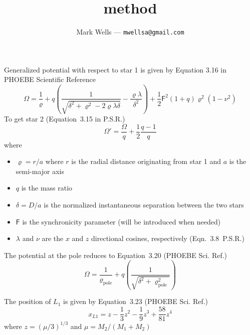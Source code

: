 \documentclass[12pt]{article}
\title{
	method
}
\author{
	Mark Wells --- \texttt{mwellsa@gmail.com}
}
\newcommand{\syncpar}{\mathsf{F}}
\newcommand{\rpole}{\varrho_\text{pole}}
\begin{document}
\maketitle

Generalized potential with respect to star 1 is given by Equation 3.16 in PHOEBE Scientific Reference
\begin{equation}
    \Omega = \frac{1}{\varrho} + q \left( \frac{1}{\sqrt{ \delta^2
                                                        + \varrho^2
                                                        - 2\varrho\lambda\delta
                                                        }
                                                  }
                                        - \frac{\varrho\lambda}{\delta^2}
                                   \right)
                                   + \frac{1}{2}\syncpar^2(1+q)\varrho^2(1-\nu^2)
\end{equation}
To get star 2 (Equation~3.15 in P.S.R.)
\begin{equation}
    \Omega' = \frac{\Omega}{q} + \frac{1}{2}\frac{q-1}{q}
\end{equation}
where
\begin{itemize}
    \item $\varrho = r/a$ where $r$ is the radial distance originating from star 1 and $a$ is the semi-major axis
    \item $q$ is the mass ratio
    \item $\delta = D/a$ is the normalized instantaneous separation between the two stars
    \item $\syncpar$ is the synchronicity parameter (will be introduced when needed)
    \item $\lambda$ and $\nu$ are the $x$ and $z$ directional cosines, respectively (Eqn.~3.8~P.S.R.)
\end{itemize}

The potential at the pole reduces to Equation~3.20 (PHOEBE Sci. Ref.)
\begin{equation}
    \Omega = \frac{1}{\rpole} + q\left(\frac{1}{\sqrt{\delta^2 + \rpole^2}}\right)
\end{equation}


The position of $L_1$ is given by Equation~3.23 (PHOEBE Sci. Ref.)
\begin{equation}
    x_{L1} = z - \frac{1}{3}z^2 - \frac{1}{9}z^3 + \frac{58}{81}z^4
\end{equation}
where $z = (\mu/3)^{1/3}$ and $\mu = M_2/(M_1 + M_2)$
\end{document}

